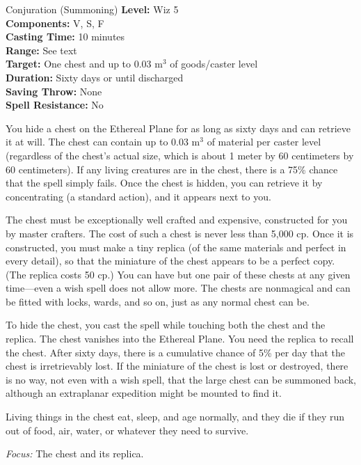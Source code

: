 {Conjuration (Summoning)}
{
	\textbf{Level:}
	Wiz 5\\
	\textbf{Components:}
	V, S, F\\
	\textbf{Casting Time:}
	10 minutes\\
	\textbf{Range:}
	See text\\
	\textbf{Target:}
	One chest and up to 0.03 m$^3$ of goods/caster level\\
	\textbf{Duration:}
	Sixty days or until discharged\\
	\textbf{Saving Throw:}
	None\\
	\textbf{Spell Resistance:}
	No\\
}
{
	You hide a chest on the Ethereal Plane for as long as sixty days and can retrieve it at will. The chest can contain up to 0.03 m$^3$ of material per caster level (regardless of the chest's actual size, which is about 1 meter by 60 centimeters by 60 centimeters). If any living creatures are in the chest, there is a 75\% chance that the spell simply fails. Once the chest is hidden, you can retrieve it by concentrating (a standard action), and it appears next to you.

	The chest must be exceptionally well crafted and expensive, constructed for you by master crafters. The cost of such a chest is never less than 5,000 cp. Once it is constructed, you must make a tiny replica (of the same materials and perfect in every detail), so that the miniature of the chest appears to be a perfect copy. (The replica costs 50 cp.) You can have but one pair of these chests at any given time---even a wish spell does not allow more. The chests are nonmagical and can be fitted with locks, wards, and so on, just as any normal chest can be.

	To hide the chest, you cast the spell while touching both the chest and the replica. The chest vanishes into the Ethereal Plane. You need the replica to recall the chest. After sixty days, there is a cumulative chance of 5\% per day that the chest is irretrievably lost. If the miniature of the chest is lost or destroyed, there is no way, not even with a wish spell, that the large chest can be summoned back, although an extraplanar expedition might be mounted to find it.

	Living things in the chest eat, sleep, and age normally, and they die if they run out of food, air, water, or whatever they need to survive.

	\textit{Focus:}
	The chest and its replica.

}
